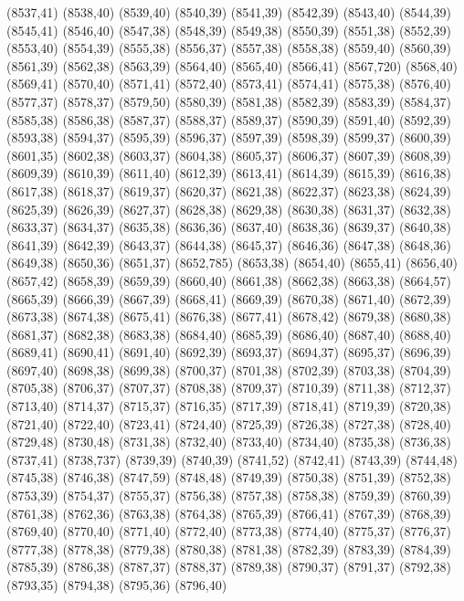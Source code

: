 (8537,41)
(8538,40)
(8539,40)
(8540,39)
(8541,39)
(8542,39)
(8543,40)
(8544,39)
(8545,41)
(8546,40)
(8547,38)
(8548,39)
(8549,38)
(8550,39)
(8551,38)
(8552,39)
(8553,40)
(8554,39)
(8555,38)
(8556,37)
(8557,38)
(8558,38)
(8559,40)
(8560,39)
(8561,39)
(8562,38)
(8563,39)
(8564,40)
(8565,40)
(8566,41)
(8567,720)
(8568,40)
(8569,41)
(8570,40)
(8571,41)
(8572,40)
(8573,41)
(8574,41)
(8575,38)
(8576,40)
(8577,37)
(8578,37)
(8579,50)
(8580,39)
(8581,38)
(8582,39)
(8583,39)
(8584,37)
(8585,38)
(8586,38)
(8587,37)
(8588,37)
(8589,37)
(8590,39)
(8591,40)
(8592,39)
(8593,38)
(8594,37)
(8595,39)
(8596,37)
(8597,39)
(8598,39)
(8599,37)
(8600,39)
(8601,35)
(8602,38)
(8603,37)
(8604,38)
(8605,37)
(8606,37)
(8607,39)
(8608,39)
(8609,39)
(8610,39)
(8611,40)
(8612,39)
(8613,41)
(8614,39)
(8615,39)
(8616,38)
(8617,38)
(8618,37)
(8619,37)
(8620,37)
(8621,38)
(8622,37)
(8623,38)
(8624,39)
(8625,39)
(8626,39)
(8627,37)
(8628,38)
(8629,38)
(8630,38)
(8631,37)
(8632,38)
(8633,37)
(8634,37)
(8635,38)
(8636,36)
(8637,40)
(8638,36)
(8639,37)
(8640,38)
(8641,39)
(8642,39)
(8643,37)
(8644,38)
(8645,37)
(8646,36)
(8647,38)
(8648,36)
(8649,38)
(8650,36)
(8651,37)
(8652,785)
(8653,38)
(8654,40)
(8655,41)
(8656,40)
(8657,42)
(8658,39)
(8659,39)
(8660,40)
(8661,38)
(8662,38)
(8663,38)
(8664,57)
(8665,39)
(8666,39)
(8667,39)
(8668,41)
(8669,39)
(8670,38)
(8671,40)
(8672,39)
(8673,38)
(8674,38)
(8675,41)
(8676,38)
(8677,41)
(8678,42)
(8679,38)
(8680,38)
(8681,37)
(8682,38)
(8683,38)
(8684,40)
(8685,39)
(8686,40)
(8687,40)
(8688,40)
(8689,41)
(8690,41)
(8691,40)
(8692,39)
(8693,37)
(8694,37)
(8695,37)
(8696,39)
(8697,40)
(8698,38)
(8699,38)
(8700,37)
(8701,38)
(8702,39)
(8703,38)
(8704,39)
(8705,38)
(8706,37)
(8707,37)
(8708,38)
(8709,37)
(8710,39)
(8711,38)
(8712,37)
(8713,40)
(8714,37)
(8715,37)
(8716,35)
(8717,39)
(8718,41)
(8719,39)
(8720,38)
(8721,40)
(8722,40)
(8723,41)
(8724,40)
(8725,39)
(8726,38)
(8727,38)
(8728,40)
(8729,48)
(8730,48)
(8731,38)
(8732,40)
(8733,40)
(8734,40)
(8735,38)
(8736,38)
(8737,41)
(8738,737)
(8739,39)
(8740,39)
(8741,52)
(8742,41)
(8743,39)
(8744,48)
(8745,38)
(8746,38)
(8747,59)
(8748,48)
(8749,39)
(8750,38)
(8751,39)
(8752,38)
(8753,39)
(8754,37)
(8755,37)
(8756,38)
(8757,38)
(8758,38)
(8759,39)
(8760,39)
(8761,38)
(8762,36)
(8763,38)
(8764,38)
(8765,39)
(8766,41)
(8767,39)
(8768,39)
(8769,40)
(8770,40)
(8771,40)
(8772,40)
(8773,38)
(8774,40)
(8775,37)
(8776,37)
(8777,38)
(8778,38)
(8779,38)
(8780,38)
(8781,38)
(8782,39)
(8783,39)
(8784,39)
(8785,39)
(8786,38)
(8787,37)
(8788,37)
(8789,38)
(8790,37)
(8791,37)
(8792,38)
(8793,35)
(8794,38)
(8795,36)
(8796,40)
